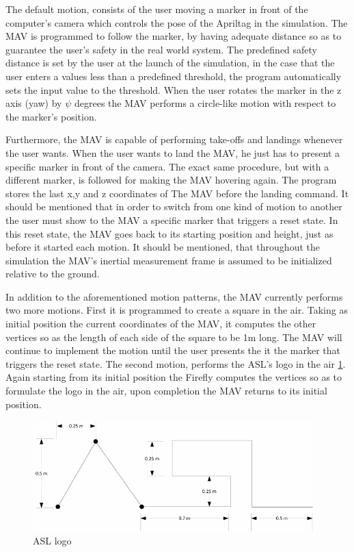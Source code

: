 The default motion, consists of the user moving a marker in front of the computer's camera which controls the pose of the Apriltag in the simulation. The MAV is programmed to follow the marker, by having adequate distance so as to guarantee the user's safety in the real world system. The predefined safety distance is set by the user at the launch of the simulation, in the case that the user enters a values less than a predefined threshold, the program automatically sets the input value to the threshold. When the user rotates the marker in the z axis (yaw) by $\psi$ degrees the MAV performs a circle-like motion with respect to the marker's position. 

Furthermore, the MAV is capable of performing take-offs and landings whenever the user wants. When the user wants to land the MAV, he just has to present a specific marker in front of the camera. The exact same procedure, but with a different marker, is followed for making the MAV hovering again. The program stores the last x,y and z coordinates of The MAV before the landing command. It should be mentioned that in order to switch from one kind of motion to another the user must show to the MAV a specific marker that triggers a reset state. In this reset state, the MAV goes back to its starting position and height, just as before it started each motion. It should be mentioned, that throughout the simulation the MAV's inertial measurement frame is assumed to be initialized relative to the ground.

In addition to the aforementioned motion patterns, the MAV currently performs two more motions. First it is programmed to create a square in the air. Taking as initial position the current coordinates of the MAV, it computes the other vertices so as the length of each side of the square to be 1m long. The MAV will continue to implement the motion until the user presents the it the marker that triggers the reset state.  The second motion, performs the ASL's logo in the air \ref{pics:asl_logo_motion}. Again starting from its initial position the Firefly computes the vertices so as to formulate the logo in the air, upon completion the MAV returns to its initial position.  


\begin{figure}
   \centering
   \includegraphics[width=0.97\textwidth]{images/asl_logo_motion.pdf}
   \caption{ASL logo}
   \label{pics:asl_logo_motion}
\end{figure}


















  
